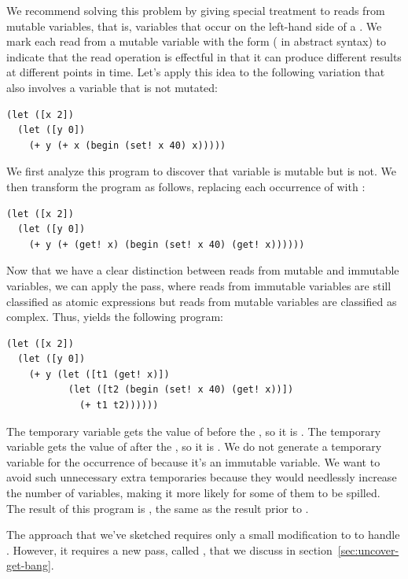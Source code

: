 \documentclass[7x10]{TimesAPriori_MIT}%
\numberwithin{theorem}{chapter}
\numberwithin{definition}{chapter}
\numberwithin{equation}{chapter}
\begin{document}
{We recommend solving this problem by giving special treatment to reads
from mutable variables, that is, variables that occur on the left-hand
side of a . We mark each read from a mutable variable with
the form  ( in abstract syntax) to indicate
that the read operation is effectful in that it can produce different
results at different points in time. Let's apply this idea to the
following variation that also involves a variable that is not mutated:
\begin{lstlisting}
(let ([x 2])
  (let ([y 0])
    (+ y (+ x (begin (set! x 40) x)))))
\end{lstlisting}
We first analyze this program to discover that variable 
is mutable but  is not. We then transform the program as
follows, replacing each occurrence of  with :
\begin{lstlisting}
(let ([x 2])
  (let ([y 0])
    (+ y (+ (get! x) (begin (set! x 40) (get! x))))))
\end{lstlisting}
Now that we have a clear distinction between reads from mutable and
immutable variables, we can apply the 
pass, where reads from immutable variables are still classified as
atomic expressions but reads from mutable variables are classified as
complex.  Thus,  yields the following
program:\\
\begin{minipage}{\textwidth}
\begin{lstlisting}
(let ([x 2])
  (let ([y 0])
    (+ y (let ([t1 (get! x)])
           (let ([t2 (begin (set! x 40) (get! x))])
             (+ t1 t2))))))
\end{lstlisting}
\end{minipage}
The temporary variable  gets the value of  before the
, so it is .  The temporary variable  gets
the value of  after the , so it is .  We
do not generate a temporary variable for the occurrence of 
because it's an immutable variable. We want to avoid such unnecessary
extra temporaries because they would needlessly increase the number of
variables, making it more likely for some of them to be spilled.  The
result of this program is , the same as the result prior to
.

The approach that we've sketched requires only a small
modification to  to handle
. However, it requires a new pass, called
, that we discuss in
section~\ref{sec:uncover-get-bang}.

}
\end{document}
